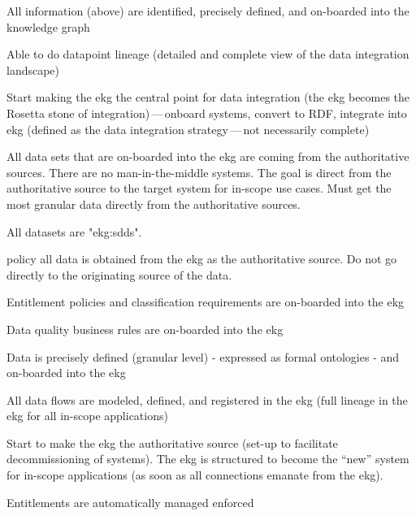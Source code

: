 \begin{scoring}

    \item All information (above) are identified, precisely defined, and on-boarded into the knowledge graph
    \item Able to do datapoint lineage (detailed and complete view of the data integration landscape)
    \item Start making the \gls{ekg} the central point for data integration (the \gls{ekg} becomes the Rosetta stone of
          integration)\,---\,onboard systems, convert to RDF, integrate into \gls{ekg} (defined as the
          data integration strategy\,---\,not necessarily complete)
    \item All data sets that are on-boarded into the \gls{ekg} are coming from the authoritative sources.
          There are no man-in-the-middle systems.
          The goal is direct from the authoritative source to the target system for in-scope use cases.
          Must get the most granular data directly from the authoritative sources.
    \item All datasets are "\glspl{ekg:sdd}".
    \item [policy] all data is obtained from the \gls{ekg} as the authoritative source.
          Do not go directly to the originating source of the data.
    \item Entitlement policies and classification requirements are on-boarded into the \gls{ekg}
    \item Data quality business rules are on-boarded into the \gls{ekg}

\end{scoring}

\kgmmscoringlevelThree

\begin{scoring}

    \item Data is precisely defined (granular level) - expressed as formal ontologies - and on-boarded into the \gls{ekg}
    \item All data flows are modeled, defined, and registered in the \gls{ekg} (full lineage in the \gls{ekg} for all
          in-scope applications)
    \item Start to make the \gls{ekg} the authoritative source (set-up to facilitate decommissioning of systems).
          The \gls{ekg} is structured to become the “new” system for in-scope applications (as soon as all
          connections emanate from the \gls{ekg}).
    \item Entitlements are automatically managed enforced

\end{scoring}

